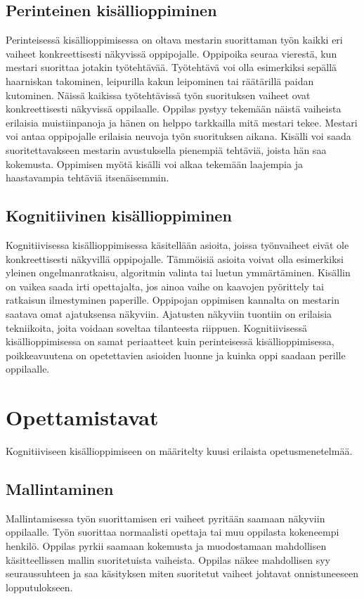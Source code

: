 \documentclass[finnish]{tktltiki2}
\theoremstyle{definition}
\theoremstyle{remark}
\begin{document}
\subsection{Perinteinen kisällioppiminen}
Perinteisessä kisällioppimisessa on oltava mestarin suorittaman työn kaikki eri vaiheet konkreettisesti näkyvissä oppipojalle. Oppipoika seuraa vierestä, kun mestari suorittaa jotakin työtehtävää. Työtehtävä voi olla esimerkiksi sepällä haarniskan takominen, leipurilla kakun leipominen tai räätärillä paidan kutominen. Näissä kaikissa työtehtävissä työn suorituksen vaiheet ovat konkreettisesti näkyvissä oppilaalle. Oppilas pystyy tekemään näistä vaiheista erilaisia muistiinpanoja ja hänen on helppo tarkkailla mitä mestari tekee. Mestari voi antaa oppipojalle erilaisia neuvoja työn suorituksen aikana. Kisälli voi saada suoritettavakseen mestarin avustuksella pienempiä tehtäviä, joista hän saa kokemusta. Oppimisen myötä kisälli voi alkaa tekemään laajempia ja haastavampia tehtäviä itsenäisemmin.


\subsection{Kognitiivinen kisällioppiminen}
Kognitiivisessa kisällioppimisessa käsitellään asioita, joissa työnvaiheet eivät ole konkreettisesti näkyvillä oppipojalle. Tämmöisiä asioita voivat olla esimerkiksi yleinen ongelmanratkaisu, algoritmin valinta tai luetun ymmärtäminen. Kisällin on vaikea saada irti opettajalta, jos ainoa vaihe on kaavojen pyörittely tai ratkaisun ilmestyminen paperille. Oppipojan oppimisen kannalta on mestarin saatava omat ajatuksensa näkyviin. Ajatusten näkyviin tuontiin on erilaisia tekniikoita, joita voidaan soveltaa tilanteesta riippuen. Kognitiivisessä kisällioppimisessa on samat periaatteet kuin perinteisessä kisällioppimisessa, poikkeavuutena on opetettavien asioiden luonne ja kuinka oppi saadaan perille oppilaalle.


\section{Opettamistavat}

Kognitiiviseen kisällioppimiseen on määritelty kuusi erilaista opetusmenetelmää. 

\subsection{Mallintaminen}
Mallintamisessa työn suorittamisen eri vaiheet pyritään saamaan näkyviin oppilaalle. Työn suorittaa normaalisti opettaja tai muu oppilasta kokeneempi henkilö. Oppilas pyrkii saamaan kokemusta ja muodostamaan mahdollisen käsitteellissen mallin suoritetuista vaiheista. Oppilas näkee mahdollisen syy seuraussuhteen ja saa käsityksen miten suoritetut vaiheet johtavat onnistuneeseen lopputulokseen. 
\end{document}
